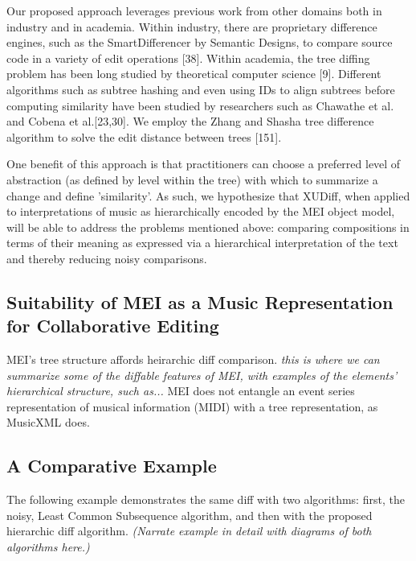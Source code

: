 \documentclass{article}
\begin{document}
Our proposed approach leverages previous work from other domains both in
industry and in academia.  Within industry, there are proprietary
difference engines, such as the SmartDifferencer by Semantic Designs,
to compare source code in a variety of edit operations [38].  Within
academia, the tree diffing problem has been long studied by
theoretical computer science [9].  Different algorithms such as
subtree hashing and even using IDs to align subtrees before computing
similarity have been studied by researchers such as Chawathe et
al. and Cobena et al.[23,30].  We employ the Zhang and Shasha tree
difference algorithm to solve the edit distance between trees [151].

One benefit of this approach is that practitioners can choose a preferred level of abstraction (as defined by level within the tree) with
which to summarize a change and define 'similarity'.  As such, we
hypothesize that XUDiff, when applied to interpretations of music as
hierarchically encoded by the MEI object model, will be able to
address the problems mentioned above: comparing compositions in terms
of their meaning as expressed via a hierarchical interpretation of the
text and thereby reducing noisy comparisons.

\subsection{Suitability of MEI as a Music Representation for Collaborative Editing}
MEI's tree structure affords heirarchic diff comparison. \emph{this is where we can summarize some of the diffable features of MEI, with examples of the elements' hierarchical structure, such as...} MEI does not entangle an event series representation of musical information (MIDI) with a tree representation, as MusicXML does.

 

\subsection{A Comparative Example}
The following example demonstrates the same diff with two algorithms: first, the noisy, Least Common Subsequence algorithm, and then with the proposed hierarchic diff algorithm. \emph{(Narrate example in detail with diagrams of both algorithms here.)}

\end{document}

